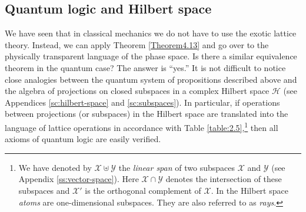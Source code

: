 \documentclass[nochecklpage]{stefan1}
\theoremstyle{definition}
\begin{document}
\subsection{Quantum logic and Hilbert space}\label{ss:qm-logic-hilbert}
We have seen that in classical mechanics we do not have to use the
exotic lattice theory. Instead, we can apply Theorem
\ref{Theorem4.13} and go over to the physically transparent language of
the phase space. Is there a similar equivalence theorem in the quantum
case? The answer is ``yes.'' It is not difficult to notice close
analogies between the quantum system of propositions described above and
the algebra of projections on closed subspaces in a complex Hilbert
space $ \mathscr{H} $ (see Appendices \ref{sc:hilbert-space} and
\ref{sc:subspaces}). In particular, if operations between projections
(or subspaces) in the Hilbert space are translated into the language of
lattice operations in accordance with Table
\ref{table:2.5},\footnote{We have denoted by $ \mathscr{X} \uplus
\mathscr{Y} $ the \emph{linear span}
\label{lb:span}
of two subspaces $ \mathscr{X} $ and $ \mathscr{Y} $ (see Appendix
\ref{ss:vector-space}). Here $ \mathscr{X} \cap \mathscr{Y} $ denotes
the intersection of these subspaces and
\label{lb:cap}
$ \mathscr{X}'$ is the orthogonal complement of $ \mathscr{X} $. In the
Hilbert space \emph{atoms} are one-dimensional subspaces. They
are also referred to as \emph{rays}.} then all axioms of quantum logic are
easily verified.
\end{document}
